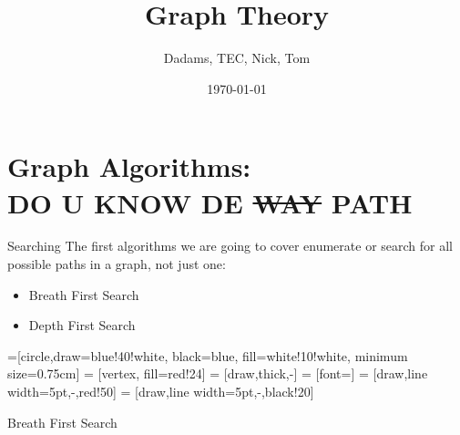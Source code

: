 \documentclass{beamer}
\title{Graph Theory}
\date{\today}
\author{Dadams, TEC, Nick, Tom}
\institute{Graph This!}
\begin{document}
\section{Graph Algorithms: \\ DO U KNOW DE \sout{WAY} PATH}
\begin{frame}{Searching}
    The first algorithms we are going to cover enumerate or search for all possible paths in a graph, not just one:
    \begin{itemize}
        \item Breath First Search
        \item Depth First Search
    \end{itemize}
\end{frame}
=[circle,draw=blue!40!white, black=blue, fill=white!10!white, minimum size=0.75cm]
 = [vertex, fill=red!24]
 = [draw,thick,-]
 = [font=\small]
 = [draw,line width=5pt,-,red!50]
 = [draw,line width=5pt,-,black!20]

\begin{frame}{Breath First Search}
\centering
{}
\end{frame}
\end{document}
